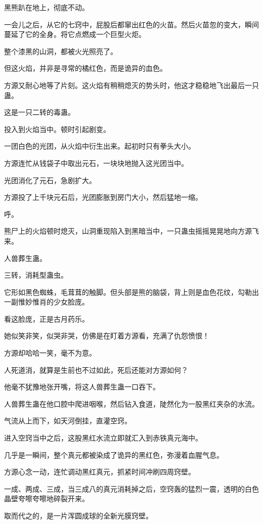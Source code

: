 \begin{this_body}
黑熊趴在地上，彻底不动。

一会儿之后，从它的七窍中，屁股后都窜出红色的火苗。然后火苗忽的变大，瞬间蔓延了它的全身。将它点燃成一个巨型火炬。

整个漆黑的山洞，都被火光照亮了。

但这火焰，并非是寻常的橘红色，而是诡异的血色。

方源又耐心地等了片刻。这火焰有稍稍熄灭的势头时，他这才稳稳地飞出最后一只蛊。

这是一只二转的毒蛊。

投入到火焰当中。顿时引起剧变。

一团白色的光团，从火焰中衍生出来。起初时只有拳头大小。

方源连忙从钱袋子中取出元石，一块块地抛入这光团当中。

光团消化了元石，急剧扩大。

方源投了上千块元石后，光团膨胀到房门大小，然后猛地一缩。

呼。

熊尸上的火焰顿时熄灭，山洞重现陷入到黑暗当中，一只蛊虫摇摇晃晃地向方源飞来。

人兽葬生蛊。

三转，消耗型蛊虫。

它形如黑色蜘蛛，毛茸茸的触脚。但头部是熊的脑袋，背上则是血色花纹，勾勒出一副惟妙惟肖的少女脸庞。

看这脸庞，正是古月药乐。

她似笑非笑，似哭非哭，仿佛是在盯着方源看，充满了仇怨愤恨！

方源却哈哈一笑，毫不为意。

人死道消，就算是生前也不过如此，死后还能对方源如何？

他毫不犹豫地张开嘴，将这人兽葬生蛊一口吞下。

人兽葬生蛊在他口腔中爬进咽喉，然后钻入食道，陡然化为一股黑红夹杂的水流。

气流从上而下，如天河倒挂，直灌空窍。

进入空窍当中之后，这股黑红水流立即就汇入到赤铁真元海中。

几乎是一瞬间，整个真元都被染成了诡异的黑红色，弥漫着血腥气息。

方源心念一动，连忙调动黑红真元，抓紧时间冲刷四周窍壁。

一成、两成、三成，当三成八的真元消耗掉之后，空窍轰的猛烈一震，透明的白色晶壁夸嚓夸嚓地碎裂开来。

取而代之的，是一片浑圆成球的全新光膜窍壁。


\end{this_body}
